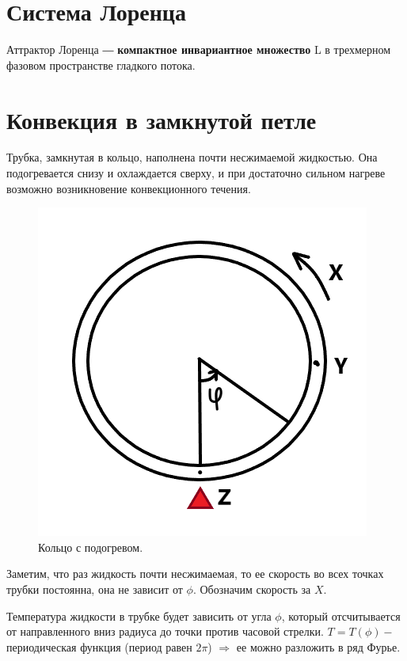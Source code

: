 \documentclass[12pt]{article}
\begin{document}

\newpage

\section{Система Лоренца}

Аттрактор Лоренца ― \textbf{компактное инвариантное множество} L в трехмерном фазовом пространстве гладкого потока.

\section{Конвекция в замкнутой петле}

Трубка, замкнутая в кольцо, наполнена почти несжимаемой жидкостью. Она подогревается снизу и охлаждается сверху, и при достаточно сильном нагреве возможно возникновение конвекционного течения.

\begin{figure}[h]
	\centering
 	\includegraphics[scale=0.5]{Lorenz.png}
 	\caption{Кольцо с подогревом.}
  	\label{fig:boat1}
\end{figure}

Заметим, что раз жидкость почти несжимаемая, то ее скорость во всех точках трубки постоянна, она не зависит от $\phi$. Обозначим скорость за $X$.

Температура жидкости в трубке будет зависить от угла $\phi$, который отсчитывается от направленного вниз радиуса до точки против часовой стрелки. $T = T(\phi) -$ периодическая функция (период равен $2\pi$) $\Rightarrow$ ее можно разложить в ряд Фурье.
\end{document}
